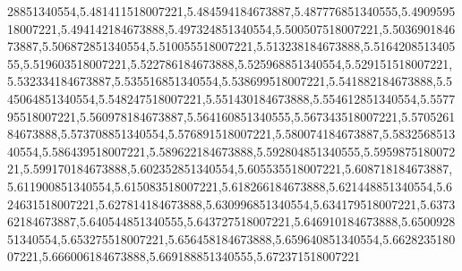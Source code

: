 28851340554,5.481411518007221,5.484594184673887,5.487776851340555,5.490959518007221,5.494142184673888,5.497324851340554,5.500507518007221,5.503690184673887,5.506872851340554,5.510055518007221,5.513238184673888,5.516420851340555,5.519603518007221,5.522786184673888,5.525968851340554,5.529151518007221,5.532334184673887,5.535516851340554,5.538699518007221,5.541882184673888,5.545064851340554,5.548247518007221,5.551430184673888,5.554612851340554,5.557795518007221,5.560978184673887,5.564160851340555,5.567343518007221,5.570526184673888,5.573708851340554,5.576891518007221,5.580074184673887,5.583256851340554,5.586439518007221,5.589622184673888,5.592804851340555,5.595987518007221,5.599170184673888,5.602352851340554,5.605535518007221,5.608718184673887,5.611900851340554,5.615083518007221,5.618266184673888,5.621448851340554,5.624631518007221,5.627814184673888,5.630996851340554,5.634179518007221,5.637362184673887,5.640544851340555,5.643727518007221,5.646910184673888,5.650092851340554,5.653275518007221,5.656458184673888,5.659640851340554,5.662823518007221,5.666006184673888,5.669188851340555,5.672371518007221
